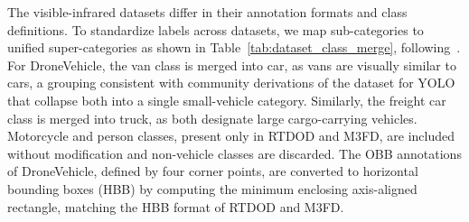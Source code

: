\documentclass[12pt,oneside,bibtotoc,liststotoc]{scrbook}
\begin{document}
The visible-infrared datasets differ in their annotation formats and class definitions.
To standardize labels across datasets, we map sub-categories to unified super-categories
as shown in Table~\ref{tab:dataset_class_merge}, following~\cite{becker2025fusionOrConfusionDatasetPooling}.
For DroneVehicle, the van class is merged into car, as vans are visually similar to cars,
a grouping consistent with community derivations of the dataset
for YOLO~\cite{redzapdos123_droneVehicleYOLOv11OBB} that collapse both into a
single small-vehicle category.
Similarly, the freight car class is merged into truck, as both designate large
cargo-carrying vehicles.
Motorcycle and person classes, present only in RTDOD and M3FD, are included without modification
and non-vehicle classes are discarded.
The OBB annotations of DroneVehicle, defined by four corner points, are converted to
horizontal bounding boxes (HBB) by computing the minimum enclosing axis-aligned rectangle,
matching the HBB format of RTDOD and M3FD.
\end{document}
